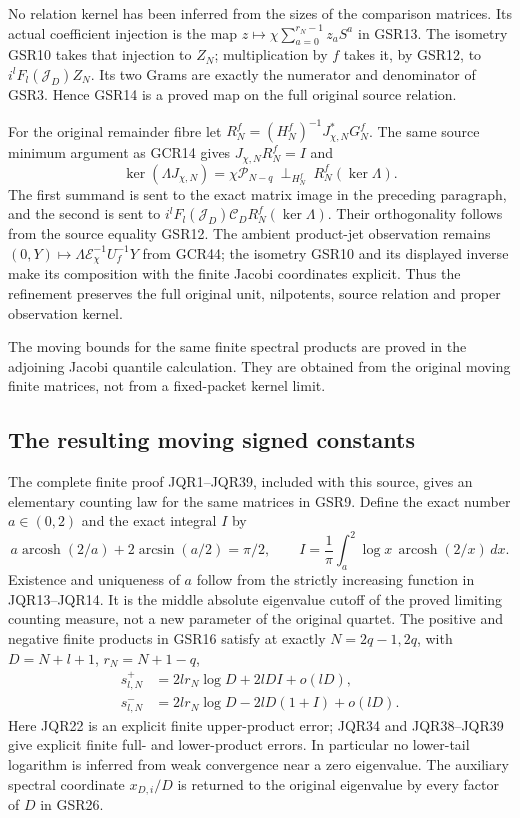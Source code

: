 \documentclass[11pt,a4paper]{article}
\begin{document}
No relation kernel has been inferred from the sizes of the
comparison matrices. Its actual coefficient injection is
the map $z\mapsto\chi\sum_{a=0}^{r_N-1}z_aS^a$ in GSR13.
The isometry GSR10 takes that injection to $Z_N$;
multiplication by $f$ takes it, by GSR12, to
$i^lF_l(\mathcal J_D)Z_N$. Its two Grams are exactly the
numerator and denominator of GSR3. Hence GSR14 is a proved
map on the full original source relation.

For the original remainder fibre let
$R_N^f=(H_N^f)^{-1}J_{\chi,N}^*G_N^f$.
The same source minimum argument as GCR14 gives
$J_{\chi,N}R_N^f=I$ and
\[
 \ker(\Lambda J_{\chi,N})
    =\chi\mathcal P_{N-q}\ \mathbin{\perp_{H_N^f}}\
                         R_N^f(\ker\Lambda).
\tag{GSR24}
\]
The first summand is sent to the exact matrix image in the
preceding paragraph, and the second is sent to
$i^lF_l(\mathcal J_D)\mathcal C_D R_N^f(\ker\Lambda)$.
Their orthogonality follows from the source equality GSR12.
The ambient product-jet observation remains
$(0,Y)\mapsto\Lambda\mathcal E_\chi^{-1}U_f^{-1}Y$
from GCR44; the isometry GSR10 and its displayed inverse
make its composition with the finite Jacobi coordinates
explicit. Thus the refinement preserves the full original
unit, nilpotents, source relation and proper observation kernel.

The moving bounds for the same finite spectral products are
proved in the adjoining Jacobi quantile calculation. They
are obtained from the original moving finite matrices,
not from a fixed-packet kernel limit.

\subsection{The resulting moving signed constants}

The complete finite proof JQR1--JQR39, included with this source,
gives an elementary counting law for the same matrices in GSR9.
Define the exact number $a\in(0,2)$ and the exact integral $I$ by
\[
 a\operatorname{arcosh}(2/a)+2\arcsin(a/2)=\pi/2,\qquad
 I=\frac1\pi\int_a^2\log x\,\operatorname{arcosh}(2/x)\,dx.
\tag{GSR25}
\]
Existence and uniqueness of $a$ follow from the strictly
increasing function in JQR13--JQR14. It is the middle absolute
eigenvalue cutoff of the proved limiting counting measure,
not a new parameter of the original quartet.
The positive and negative finite products in GSR16 satisfy
at exactly $N=2q-1,2q$, with $D=N+l+1$, $r_N=N+1-q$,
\[
\begin{split}
 s^+_{l,N}
     &=2lr_N\log D+2lD I+o(lD),\\
 s^-_{l,N}
     &=2lr_N\log D-2lD(1+I)+o(lD).
\end{split}\tag{GSR26}
\]
Here JQR22 is an explicit finite upper-product error;
JQR34 and JQR38--JQR39 give explicit finite full- and
lower-product errors. In particular no lower-tail logarithm
is inferred from weak convergence near a zero eigenvalue.
The auxiliary spectral coordinate $x_{D,i}/D$ is returned
to the original eigenvalue by every factor of $D$ in GSR26.
\end{document}

